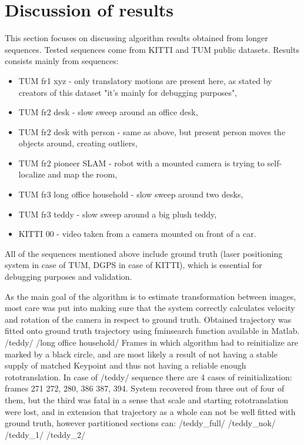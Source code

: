 \chapter{Discussion of results}

This section focuses on discussing algorithm results obtained from longer sequences. Tested sequences come from KITTI and TUM public datasets. Results consists mainly from sequences:
\begin{itemize}
	\item TUM fr1 xyz - only translatory motions are present here, as stated by creators of this dataset "it's mainly for debugging purposes",
	\item TUM fr2 desk - slow sweep around an office desk,
	\item TUM fr2 desk with person - same as above, but present person moves the objects around, creating outliers,
	\item TUM fr2 pioneer SLAM - robot with a mounted camera is trying to self-localize and map the room,
	\item TUM fr3 long office household - slow sweep around two desks,
	\item TUM fr3 teddy - slow sweep around a big plush teddy,
	\item KITTI 00 - video taken from a camera mounted on front of a car.
\end{itemize}
All of the sequences mentioned above include ground truth (laser positioning system in case of TUM, DGPS in case of KITTI), which is essential for debugging purposes and validation.

As the main goal of the algorithm is to estimate transformation between images, most care was put into making sure that the system correctly calculates velocity and rotation of the camera in respect to ground truth. Obtained trajectory was fitted onto ground truth trajectory using fminsearch function available in Matlab.
/teddy/
/long office household/
Frames in which algorithm had to reinitialize are marked by a black circle, and are most likely a result of not having a stable supply of matched Keypoint and thus not having a reliable enough rototranslation. In case of /teddy/ sequence there are 4 cases of reinitialization: frames 271 272, 280, 386 387, 394. System recovered from three out of four of them, but the third was fatal in a sense that scale and starting rototranslation were lost, and in extension that trajectory as a whole can not be well fitted with ground truth, however partitioned sections can:
/teddy\_full/
/teddy\_nok/
/teddy\_1/
/teddy\_2/

